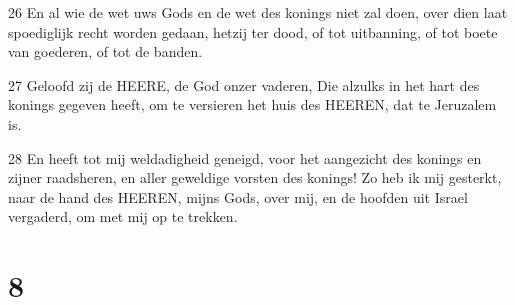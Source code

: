 \par 26 En al wie de wet uws Gods en de wet des konings niet zal doen, over dien laat spoediglijk recht worden gedaan, hetzij ter dood, of tot uitbanning, of tot boete van goederen, of tot de banden.
\par 27 Geloofd zij de HEERE, de God onzer vaderen, Die alzulks in het hart des konings gegeven heeft, om te versieren het huis des HEEREN, dat te Jeruzalem is.
\par 28 En heeft tot mij weldadigheid geneigd, voor het aangezicht des konings en zijner raadsheren, en aller geweldige vorsten des konings! Zo heb ik mij gesterkt, naar de hand des HEEREN, mijns Gods, over mij, en de hoofden uit Israel vergaderd, om met mij op te trekken.

\chapter{8}

